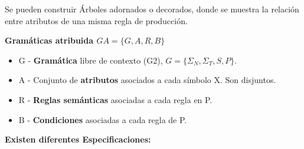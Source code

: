 \documentclass[12pt, twoside, openright]{report} %
\begin{document}
Se pueden construir Árboles adornados o decorados, donde se muestra la relación entre atributos de una misma regla de producción.

\textbf{Gramáticas atribuida $GA=\{G,A,R,B\}$}
\begin{itemize}
  \item G - \textbf{Gramática} libre de contexto (G2), $G = \{\Sigma_N, \Sigma_T, S, P\}$.
  \item A - Conjunto de \textbf{atributos} asociados a cada símbolo X. Son disjuntos.
  \item R - \textbf{Reglas semánticas} asociadas a cada regla en P.
  \item B - \textbf{Condiciones} asociadas a cada regla de P.
\end{itemize}

\textbf{Existen diferentes Especificaciones:}
\end{document}
